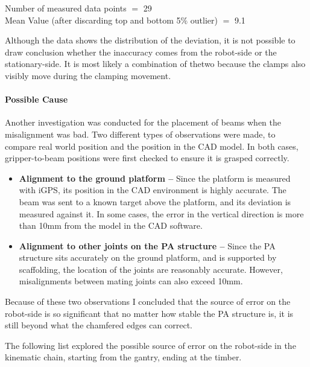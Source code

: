 

{\footnotesize Number of measured data points $=$ 29 \\ Mean Value (after discarding top and bottom 5$\%$ outlier) $=$ 9.1}

Although the data shows the distribution of the deviation, it is not possible to draw conclusion whether the inaccuracy comes from the robot-side or the stationary-side. It is most likely a combination of thetwo because the clamps also visibly move during the clamping movement. 

\paragraph{Possible Cause}

Another investigation was conducted for the placement of beams when the misalignment was bad. Two different types of observations were made, to compare real world position and the position in the CAD model. In both cases, gripper-to-beam positions were first checked to ensure it is grasped correctly.

\begin{itemize}
	\item \textbf{Alignment to the ground platform --} Since the platform is measured with iGPS, its position in the CAD environment is highly accurate. The beam was sent to a known target above the platform, and its deviation is measured against it. In some cases, the error in the vertical direction is more than 10mm from the model in the CAD software. 

	\item \textbf{Alignment to other joints on the PA structure --} Since the PA structure sits accurately on the ground platform, and is supported by scaffolding, the location of the joints are reasonably accurate. However, misalignments between mating joints can also exceed 10mm. 

\end{itemize}
Because of these two observations I concluded that the source of error on the robot-side is so significant that no matter how stable the PA structure is, it is still beyond what the chamfered edges can correct. 

The following list explored the possible source of error on the robot-side in the kinematic chain, starting from the gantry, ending at the timber.

